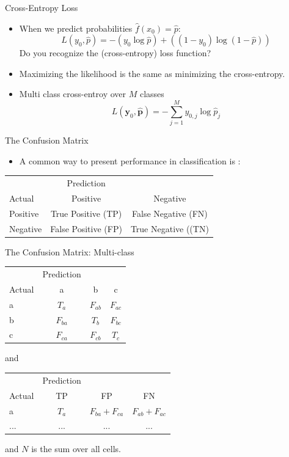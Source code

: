 \documentclass[10pt]{beamer}
\begin{document}
\begin{frame}{Cross-Entropy Loss}

\begin{itemize}
\item When we predict probabilities $\hat{f}(x_0)=\hat{p}$:
\[
L(y_0, \hat{p}) = - (y_0 \log{\hat{p}}) + ((1 - y_0) \log{(1- \hat{p})})
\]
 Do you recognize the (cross-entropy) loss function?
\pause
\item Maximizing the likelihood is the same as minimizing the cross-entropy. \pause
\item Multi class cross-entroy over $M$ classes
\[
L(\mathbf{y}_0, \hat{\mathbf{p}}) = - \sum^M_{j=1} y_{0,j} \log{\hat{p}_j}
\]
\end{itemize}

\end{frame}


\begin{frame}{The Confusion Matrix}

\begin{itemize}
\item A common way to present performance in classification is :
\end{itemize}
\centering
\begin{tabular}{lcc}
  & Prediction &  \\
  Actual & Positive & Negative \\
  Positive & True Positive (TP) & False Negative (FN) \\
  Negative & False Positive (FP) & True Negative ((TN)
\end{tabular}


\end{frame}

\begin{frame}{The Confusion Matrix: Multi-class}

\centering
\begin{tabular}{lccc}
  & Prediction &  \\
  Actual & a & b & c \\
  a & $T_a$ & $F_{ab}$ & $F_{ac}$ \\
  b & $F_{ba}$ & $T_b$ & $F_{bc}$ \\
  c & $F_{ca}$ & $F_{cb}$ & $T_c$ \\
\end{tabular}
and
\centering
\begin{tabular}{lccc}
  & Prediction &  \\
  Actual & TP & FP & FN \\
  a & $T_a$ & $F_{ba} + F_{ca}$ & $F_{ab} + F_{ac}$ \\
  ... & ... & ... & ...
\end{tabular}
and $N$ is the sum over all cells.



\end{frame}
\end{document}
